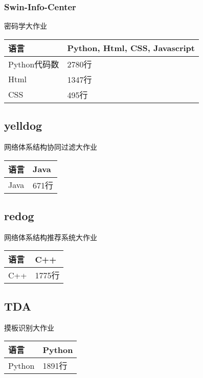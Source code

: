 \documentclass[a4paper]{ctexart}
\begin{document}
    \subsubsection {Swin-Info-Center}
    \par 密码学大作业 
    \begin{tabular}[]{l|l}
    \hline
    语言            &   Python, Html, CSS, Javascript   \\
    \hline
    Python代码数    &   2780行                          \\
    \hline
    Html            &   1347行                          \\
    \hline
    CSS             &   495行                           \\
    \hline
    \end{tabular}

    \subsection{yelldog}
    \par 网络体系结构协同过滤大作业
    \begin{tabular}[]{ll}
        \hline
        语言        &   Java                            \\
    \hline
        Java        &   671行                           \\
    \hline
    \end{tabular}

    \subsection{redog}
    \par 网络体系结构推荐系统大作业
    \begin{tabular}[]{l|l}
        \hline
        语言        &   C++                             \\
        \hline
        C++         &   1775行                          \\
        \hline
    \end{tabular}

    \subsection{TDA}
    \par 摸板识别大作业
    \begin{tabular}[]{l|l}
        \hline
        语言        &   Python                             \\
        \hline
        Python          &   1891行                          \\
        \hline
    \end{tabular}



    
    
\end{document}
